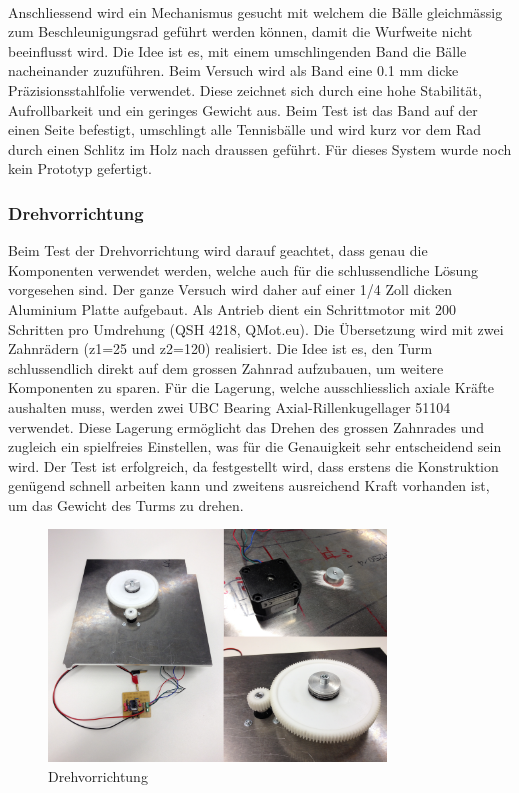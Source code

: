 \noindent
\\Anschliessend wird ein Mechanismus gesucht mit welchem die Bälle 
gleichmässig zum Beschleunigungsrad geführt werden können, damit die Wurfweite 
nicht beeinflusst wird. Die Idee ist es, mit einem umschlingenden Band die 
Bälle nacheinander zuzuführen. Beim Versuch wird als Band eine 0.1 mm dicke 
Präzisionsstahlfolie verwendet. Diese zeichnet sich durch eine hohe Stabilität, 
Aufrollbarkeit und ein geringes Gewicht aus. Beim Test ist das Band auf der 
einen Seite befestigt, umschlingt alle Tennisbälle und wird kurz vor dem Rad 
durch einen Schlitz im Holz nach draussen geführt. Für dieses System wurde noch kein Prototyp gefertigt. \\


\subsubsection{Drehvorrichtung}
Beim Test der Drehvorrichtung wird darauf geachtet, dass genau die Komponenten 
verwendet werden, welche auch für die schlussendliche Lösung vorgesehen sind. 
Der ganze Versuch wird daher auf einer 1/4 Zoll dicken Aluminium Platte 
aufgebaut. Als Antrieb dient ein Schrittmotor mit 200 Schritten pro Umdrehung 
(QSH 4218, QMot.eu). Die Übersetzung wird mit zwei Zahnrädern (z1=25 und z2=120) 
realisiert. Die Idee ist es, den Turm schlussendlich direkt auf dem grossen 
Zahnrad aufzubauen, um weitere Komponenten zu sparen. Für die Lagerung, welche 
ausschliesslich axiale Kräfte aushalten muss, werden zwei UBC Bearing 
Axial-Rillenkugellager 51104 verwendet. Diese Lagerung ermöglicht das Drehen 
des grossen Zahnrades und zugleich ein spielfreies Einstellen, was für die 
Genauigkeit sehr entscheidend sein wird.
Der Test ist erfolgreich, da festgestellt wird, dass erstens die Konstruktion 
genügend schnell arbeiten kann und zweitens ausreichend Kraft vorhanden ist, 
um das Gewicht des Turms zu drehen.

\begin{figure}[h!]          
	\centering             
	\includegraphics[width=0.8\textwidth]{fig/Drehvorrichtung.png}    
	\caption{Drehvorrichtung}
	
	\label{fig:Drehvorrichtung}
\end{figure}
\noindent



